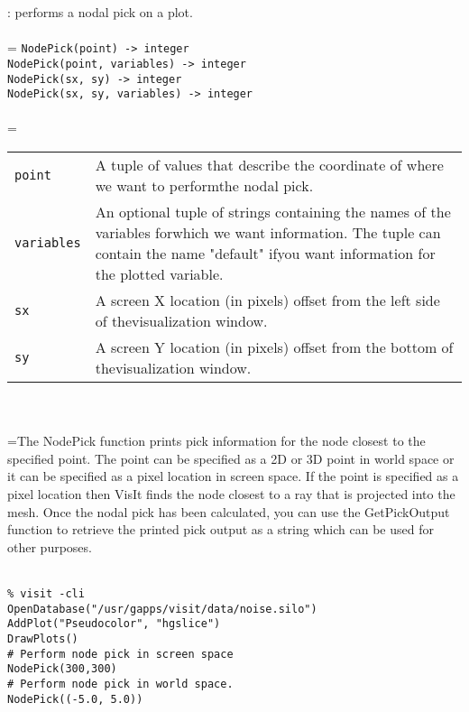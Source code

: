 \documentclass[10pt,a4paper]{report}
\begin{document}
{}
: performs a nodal pick on a plot.\\[-3mm]

 \\ 
\hangindent=\parindent 
\verb!NodePick(point) -> integer!\\ 
\verb!NodePick(point, variables) -> integer!\\ 
\verb!NodePick(sx, sy) -> integer!\\ 
\verb!NodePick(sx, sy, variables) -> integer!\\ [-3mm]

 \\ 
\hangindent=\parindent 
\begin{tabular}{lp{9cm}}
\verb!point! & A tuple of values that describe the coordinate of where we want to performthe nodal pick. \\
\verb!variables! & An optional tuple of strings containing the names of the variables forwhich we want information. The tuple can contain the name "default" ifyou want information for the plotted variable. \\
\verb!sx! & A screen X location (in pixels) offset from the left side of thevisualization window. \\
\verb!sy! & A screen Y location (in pixels) offset from the bottom of thevisualization window. \\
\end{tabular} \\[-2mm]


 \\ 
\hangindent=\parindent The NodePick function prints pick information for the node closest to the specified point. The point can be specified as a 2D or 3D point in world space or it can be specified as a pixel location in screen space. If the point is specified as a pixel location then VisIt finds the node closest to a ray that is projected into the mesh. Once the nodal pick has been calculated, you can use the GetPickOutput function to retrieve the printed pick output as a string which can be used for other purposes. \\[-3mm] 

\\[-6mm]
\begin{verbatim}% visit -cli
OpenDatabase("/usr/gapps/visit/data/noise.silo")
AddPlot("Pseudocolor", "hgslice")
DrawPlots()
# Perform node pick in screen space
NodePick(300,300)
# Perform node pick in world space.
NodePick((-5.0, 5.0))
\end{verbatim}
\newpage
\end{document}
